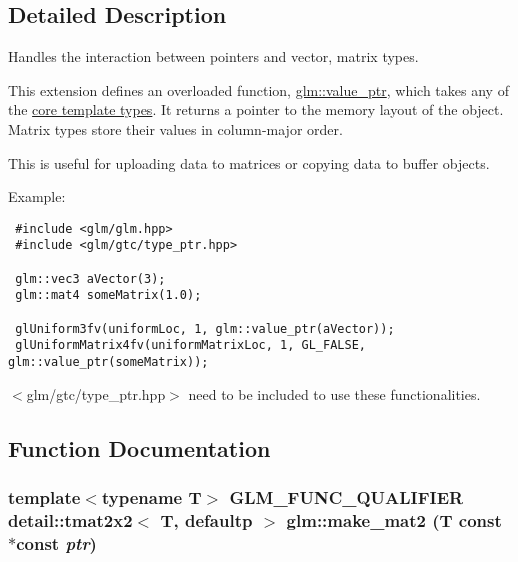 \subsection{Detailed Description}
Handles the interaction between pointers and vector, matrix types. 

This extension defines an overloaded function, \hyperlink{group__gtc__type__ptr_g87d5cb613f75f83973609ccb8922200b}{glm::value\_\-ptr}, which takes any of the \hyperlink{group__core__template}{core template types}. It returns a pointer to the memory layout of the object. Matrix types store their values in column-major order.

This is useful for uploading data to matrices or copying data to buffer objects.

Example: 

\begin{Code}\begin{verbatim} #include <glm/glm.hpp>
 #include <glm/gtc/type_ptr.hpp>
 
 glm::vec3 aVector(3);
 glm::mat4 someMatrix(1.0);
 
 glUniform3fv(uniformLoc, 1, glm::value_ptr(aVector));
 glUniformMatrix4fv(uniformMatrixLoc, 1, GL_FALSE, glm::value_ptr(someMatrix));
\end{verbatim}
\end{Code}



$<$glm/gtc/type\_\-ptr.hpp$>$ need to be included to use these functionalities. 

\subsection{Function Documentation}
\hypertarget{group__gtc__type__ptr_g08f35700be4d2e627da4d894edfa1b60}{
\subsubsection[make\_\-mat2]{\setlength{\rightskip}{0pt plus 5cm}template$<$typename T$>$ GLM\_\-FUNC\_\-QUALIFIER detail::tmat2x2$<$ T, defaultp $>$ glm::make\_\-mat2 (T const $\ast$const  {\em ptr})}}
\label{group__gtc__type__ptr_g08f35700be4d2e627da4d894edfa1b60}


